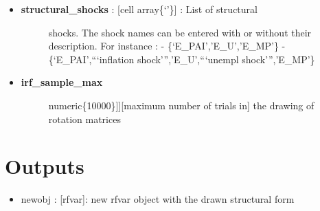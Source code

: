 \documentclass[letterpaper,10pt,english]{sphinxmanual}
\begin{document}
\begin{itemize}
\begin{itemize}
\begin{description}
\end{description}

\item {} \begin{description}
\item[{\textbf{structural\_shocks} : {[}cell array\textbar{}\{`'\}{]} : List of structural}] \leavevmode
shocks. The shock names can be entered with or without their
description. For instance :
- \{`E\_PAI','E\_U','E\_MP'\}
- \{`E\_PAI',```inflation shock''','E\_U',```unempl shock''','E\_MP'\}

\end{description}

\item {} \begin{description}
\item[{\textbf{irf\_sample\_max}}] \leavevmode{[}{[}numeric\textbar{}\{10000\}{]}{]}{[}maximum number of trials in{]}
the drawing of rotation matrices

\end{description}

\end{itemize}

\end{itemize}


\section{Outputs}
\label{classes/models/@rfvar/rfvar:id141}\begin{itemize}
\item {} 
newobj : {[}rfvar{]}: new rfvar object with the drawn structural form

\end{itemize}
\end{document}

